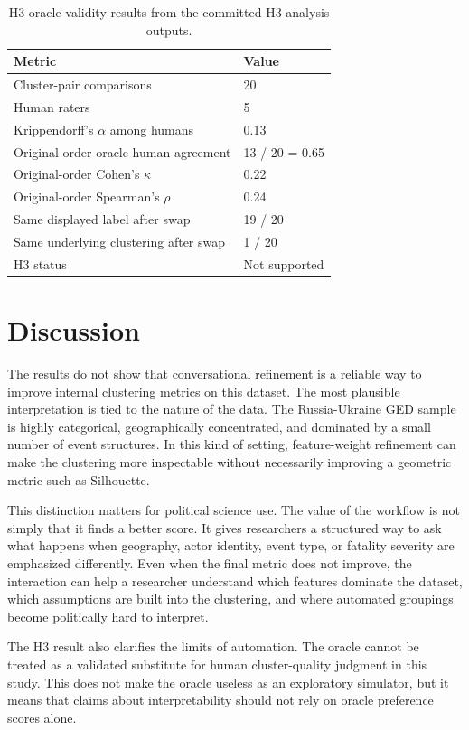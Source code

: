 \documentclass[11pt,a4paper]{article}
\begin{document}
\begin{table}[H]
\centering
\begin{tabular}{ll}
\toprule
Metric & Value \\
\midrule
Cluster-pair comparisons & 20 \\
Human raters & 5 \\
Krippendorff's $\alpha$ among humans & 0.13 \\
Original-order oracle-human agreement & 13 / 20 = 0.65 \\
Original-order Cohen's $\kappa$ & 0.22 \\
Original-order Spearman's $\rho$ & 0.24 \\
Same displayed label after swap & 19 / 20 \\
Same underlying clustering after swap & 1 / 20 \\
H3 status & Not supported \\
\bottomrule
\end{tabular}
\caption{H3 oracle-validity results from the committed H3 analysis outputs.}
\label{tab:h3}
\end{table}

\section{Discussion}

The results do not show that conversational refinement is a reliable way to improve internal clustering metrics on this dataset. The most plausible interpretation is tied to the nature of the data. The Russia-Ukraine GED sample is highly categorical, geographically concentrated, and dominated by a small number of event structures. In this kind of setting, feature-weight refinement can make the clustering more inspectable without necessarily improving a geometric metric such as Silhouette.

This distinction matters for political science use. The value of the workflow is not simply that it finds a better score. It gives researchers a structured way to ask what happens when geography, actor identity, event type, or fatality severity are emphasized differently. Even when the final metric does not improve, the interaction can help a researcher understand which features dominate the dataset, which assumptions are built into the clustering, and where automated groupings become politically hard to interpret.

The H3 result also clarifies the limits of automation. The oracle cannot be treated as a validated substitute for human cluster-quality judgment in this study. This does not make the oracle useless as an exploratory simulator, but it means that claims about interpretability should not rely on oracle preference scores alone.
\end{document}
